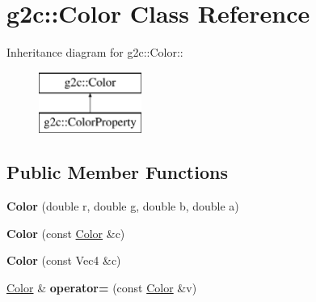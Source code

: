 \hypertarget{classg2c_1_1_color}{
\section{g2c::Color Class Reference}
\label{classg2c_1_1_color}
}
Inheritance diagram for g2c::Color::\begin{figure}[H]
\begin{center}
\leavevmode
\includegraphics[height=2cm]{classg2c_1_1_color}
\end{center}
\end{figure}
\subsection*{Public Member Functions}
\begin{DoxyCompactItemize}
\item 
\hypertarget{classg2c_1_1_color_a6c42a25920b142136d2ee34fe3490e9d}{
{\bfseries Color} (double r, double g, double b, double a)}
\label{classg2c_1_1_color_a6c42a25920b142136d2ee34fe3490e9d}

\item 
\hypertarget{classg2c_1_1_color_a9f5ddd4f246e0d973f4258314a5f1073}{
{\bfseries Color} (const \hyperlink{classg2c_1_1_color}{Color} \&c)}
\label{classg2c_1_1_color_a9f5ddd4f246e0d973f4258314a5f1073}

\item 
\hypertarget{classg2c_1_1_color_aab192298aaf7306a2a96a89e302ca006}{
{\bfseries Color} (const Vec4 \&c)}
\label{classg2c_1_1_color_aab192298aaf7306a2a96a89e302ca006}

\item 
\hypertarget{classg2c_1_1_color_af28e509730f2efda299eb7f321a2e9fd}{
\hyperlink{classg2c_1_1_color}{Color} \& {\bfseries operator=} (const \hyperlink{classg2c_1_1_color}{Color} \&v)}
\label{classg2c_1_1_color_af28e509730f2efda299eb7f321a2e9fd}

\end{DoxyCompactItemize}
